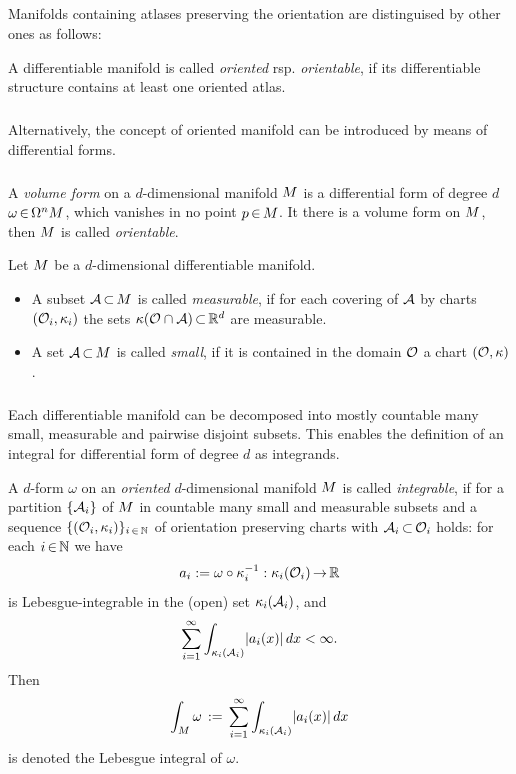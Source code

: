 \documentclass[11pt,twoside]{article}
\begin{document}
\subparagraph{}
Manifolds containing atlases preserving the orientation are distinguised
by other ones as follows:

\begin{definition}
A differentiable manifold is called \textit{oriented}
rsp. \textit{orientable},
if its differentiable structure contains at least one oriented atlas.
\end{definition}

\subparagraph{}
Alternatively,
the concept of oriented manifold can be introduced
by means of differential forms.

\subparagraph{}
A \textit{volume form} on a $d$-dimensional manifold ${M}$
is a differential form of degree $d$ $\omega {\,\in\,} \Omega^n {M}$,
which vanishes in no point $p {\,\in\,} {M}$.
It there is a volume form on ${M}$,
then ${M}$ is called \textit{orientable}.

\begin{definition}
Let ${M}$ be a $d$-dimensional differentiable manifold.
\begin{itemize}[leftmargin=15pt]
\item[1.]
A subset ${\mathcal{A}} {\,\subset\,} {M}$ is called \textit{measurable},
if for each covering of ${\mathcal{A}}$ by charts $(\mathcal{O}_i,\kappa_i)$
the sets $\kappa(\mathcal{O} \cap {\mathcal{A}}) {\,\subset\,} {\mathbb{R}}^d$ are measurable.
\item[2.]
A set ${\mathcal{A}} {\,\subset\,} {M}$ is called \textit{small},
if it is contained in the domain $\mathcal{O}$ a chart $(\mathcal{O},\kappa)$.
\end{itemize}
\end{definition}

\subparagraph{}
Each differentiable manifold can be decomposed into mostly countable
many small, measurable and pairwise disjoint subsets.
This enables the definition of an integral for differential form
of degree $d$ as integrands.

\begin{definition}
A $d$-form $\omega$ on an \textit{oriented} $d$-dimensional
manifold ${M}$ is called \textit{integrable},
if for a partition $\{{\mathcal{A}}_i\}$ of ${M}$ in countable
many small and measurable subsets and a sequence
$\{(\mathcal{O}_i,\kappa_i)\}_{i {\,\in\,} {\mathbb{N}}}$ of
orientation preserving charts with ${\mathcal{A}}_i {\,\subset\,} \mathcal{O}_i$ holds:
for each $i {\,\in\,} {\mathbb{N}}$ we have
\[
a_i := \omega \circ \kappa_i^{-1} : \kappa_i(\mathcal{O}_i) {\,\to\,} {\mathbb{R}}
\]
is Lebesgue-integrable in the (open) set $\kappa_i({\mathcal{A}}_i)$,
and
\[
\sum_{i=1}^{\infty} \int_{\kappa_i(\A_i)} \abs{a_i(x)} \, dx < \infty.
\]
Then
\[
\int_{\difM} \omega \, := \,
\sum_{i=1}^{\infty} \int_{\kappa_i(\A_i)} \abs{a_i(x)} \, dx
\]
is denoted the Lebesgue integral of $\omega$.
\end{definition}
\end{document}
